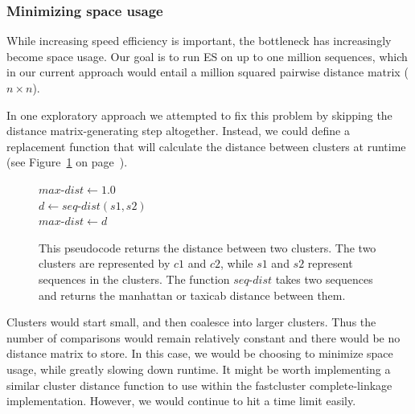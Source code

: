 \subsubsection*{Minimizing space usage}
While increasing speed efficiency is important, the bottleneck has increasingly become space usage.
Our goal is to run ES on up to one million sequences, which in our current approach would entail a million squared pairwise distance matrix ($n \times n$).

In one exploratory approach we attempted to fix this problem by skipping the distance matrix-generating step altogether.
Instead, we could define a replacement function that will calculate the distance between clusters at runtime (see Figure~\ref{code:LazyClustering} on page~\pageref{code:LazyClustering}).
\begin{figure}[h!]
\begin{algorithm}[H]
 \SetAlgoLined

\BlankLine
 $max$-$dist \gets 1.0$\\
  {
    {
    $d \gets seq$-$dist(s1, s2)$\\
     {
      $max$-$dist \gets d$
    }
   }
 }
\end{algorithm}
\caption[Pseudocode showing a distance function for two clusters.]{This pseudocode returns the distance between two clusters. The two clusters are represented by $c1$ and $c2$, while $s1$ and $s2$ represent sequences in the clusters. The function $seq$-$dist$ takes two sequences and returns the manhattan or taxicab distance between them.}
\label{code:LazyClustering}
\end{figure}
Clusters would start small, and then coalesce into larger clusters.
Thus the number of comparisons would remain relatively constant and there would be no distance matrix to store.
In this case, we would be choosing to minimize space usage, while greatly slowing down runtime.
It might be worth implementing a similar cluster distance function to use within the fastcluster complete-linkage implementation.
However, we would continue to hit a time limit easily.

